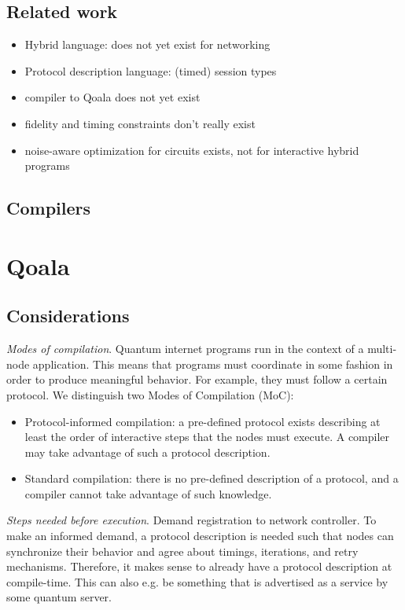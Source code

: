 \subsection{Related work}
\begin{itemize}
    \item Hybrid language: does not yet exist for networking
    \item Protocol description language: (timed) session types
    \item compiler to Qoala does not yet exist
    \item fidelity and timing constraints don't really exist
    \item noise-aware optimization for circuits exists, not for interactive hybrid programs
\end{itemize}


\subsection{Compilers}

\section{Qoala}

\subsection{Considerations}

\textit{Modes of compilation}. Quantum internet programs run in the context of a multi-node application.
This means that programs must coordinate in some fashion in order to produce meaningful behavior.
For example, they must follow a certain protocol.
We distinguish two Modes of Compilation (MoC):
\begin{itemize}
    \item Protocol-informed compilation: a pre-defined protocol exists describing at least the order of interactive steps that the nodes must execute. A compiler may take advantage of such a protocol description.
    \item Standard compilation: there is no pre-defined description of a protocol, and a compiler cannot take advantage of such knowledge.
\end{itemize}

\textit{Steps needed before execution}.
Demand registration to network controller. To make an informed demand, a protocol description is needed such that nodes can synchronize their behavior and agree about timings, iterations, and retry mechanisms. Therefore, it makes sense to already have a protocol description at compile-time. This can also e.g. be something that is advertised as a service by some quantum server.

